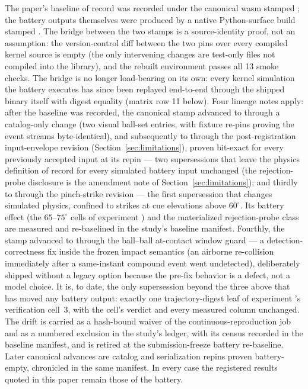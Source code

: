 The paper's baseline of record was recorded under the canonical wasm
stamped ; the battery outputs themselves were
produced by a native Python-surface build stamped .
The bridge between the two stamps is a source-identity proof, not an
assumption: the version-control diff between the two pins over every
compiled kernel source is empty (the only intervening changes are
test-only files not compiled into the library), and the rebuilt
environment passes all 13 smoke checks. The bridge is no longer
load-bearing on its own: every kernel simulation the battery executes
has since been replayed end-to-end through the shipped binary itself
with digest equality (matrix row 11 below). Four lineage notes apply: after
the baseline was recorded, the canonical stamp advanced to
 through a catalog-only change (two visual ball-set
entries, with fixture re-pins proving the event streams byte-identical),
and subsequently to  through the post-registration
input-envelope revision (Section~\ref{sec:limitations}), proven
bit-exact for every previously
accepted input at its repin --- two supersessions that leave the physics
definition of record for every simulated battery input unchanged (the
 rejection-probe disclosure is the amendment note of
Section~\ref{sec:limitations}); and thirdly to 
through the pinch-strike revision
--- the first supersession that changes simulated physics, confined to
strikes at cue elevations above $60^\circ$. Its battery effect (the
$65$--$75^\circ$ cells of experiment ) and the materialized
 rejection-probe class are measured and re-baselined in the
study's baseline manifest. Fourthly, the stamp
advanced to  through the ball--ball at-contact
window guard --- a detection-correctness fix inside the frozen impact
semantics (an airborne re-collision immediately after a same-instant
compound event went undetected), deliberately shipped without a legacy
option because the pre-fix behavior is a defect, not a model choice. It
is, to date, the only supersession beyond the three above that has
moved any battery output: exactly one trajectory-digest leaf of
experiment 's verification cell~3, with the cell's verdict
and every measured column unchanged. The drift is carried as a
hash-bound waiver of the continuous-reproduction job and as a numbered
exclusion in the study's ledger, with its census recorded in the
baseline manifest, and is retired at the submission-freeze battery
re-baseline. Later canonical advances are catalog and serialization
repins proven battery-empty, chronicled in the same manifest. In every
case the registered results quoted in this
paper remain those of the  battery.

